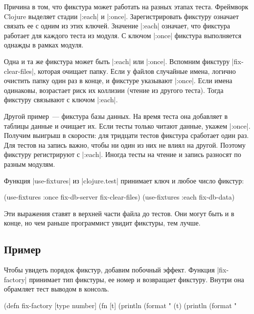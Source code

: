 Причина в том, что фикстура может работать на разных этапах теста. Фреймворк
Clojure выделяет стадии \spverb|:each| и \spverb|:once|. Зарегистрировать
фикстуру означает связать ее с одним из этих ключей. Значение \spverb|:each|
означает, что фикстура работает для каждого теста из модуля. С ключом
\spverb|:once| фикстура выполняется однажды в рамках модуля.

Одна и та же фикстура может быть \spverb|:each| или \spverb|:once|. Вспомним
фикстуру \spverb|fix-clear-files|, которая очищает папку. Если у файлов
случайные имена, логично очистить папку один раз в конце, и фикстуре указывают
\spverb|:once|. Если имена одинаковы, возрастает риск их коллизии (чтение из
другого теста). Тогда фикстуру связывают с ключом \spverb|:each|.

Другой пример~--- фикстура базы данных. На время теста она добавляет в таблицы
данные и очищает их. Если тесты только читают данные, укажем
\spverb|:once|. Получим выигрыш в скорости: для тридцати тестов фикстура
сработает один раз. Для тестов на запись важно, чтобы ни один из них не влиял на
другой. Поэтому фикстуру регистрируют с \spverb|:each|. Иногда тесты на чтение и
запись разносят по разным модулям.

Функция \spverb|use-fixtures| из \spverb|clojure.test| принимает ключ и любое
число фикстур:

\begin{english}
  \begin{clojure}
(use-fixtures :once fix-db-server fix-clear-files)
(use-fixtures :each fix-db-data)
  \end{clojure}
\end{english}

Эти выражения ставят в верхней части файла до тестов. Они могут быть и в конце,
но чем раньше программист увидит фикстуры, тем лучше.

\subsection{Пример}

Чтобы увидеть порядок фикстур, добавим побочный эффект. Функция
\spverb|fix-factory| принимает тип фикстуры, ее номер и возвращает
фикстуру. Внутри она обрамляет тест выводом в консоль.

\begin{english}
  \begin{clojure}
(defn fix-factory [type number]
  (fn [t]
    (println (format "%
    (t)
    (println (format "%
  \end{clojure}
\end{english}

